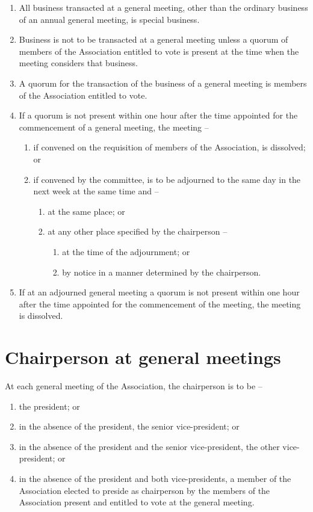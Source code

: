 \documentclass[a4paper,11pt]{article}
\begin{document}
\begin{enumerate}
	\item All business transacted at a general meeting, other than the ordinary business of an annual general meeting, is special business.
	\item Business is not to be transacted at a general meeting unless a quorum of members of the Association entitled to vote is present at the time when the meeting considers that business.
	\item A quorum for the transaction of the business of a general meeting is \orgQuorum{} members of the Association entitled to vote.
	
	\item If a quorum is not present within one hour after the time appointed for the commencement of a general meeting, the meeting --
	\begin{enumerate}
		\item if convened on the requisition of members of the Association, is dissolved; or

		\item if convened by the committee, is to be adjourned to the same day in the next week at the same time and --
		\begin{enumerate}
			\item at the same place; or
			
			\item at any other place specified by the chairperson --
			\begin{enumerate}
				\item at the time of the adjournment; or
				\item by notice in a manner determined by the chairperson.
			\end{enumerate}
		\end{enumerate}
	\end{enumerate}
	
	\item If at an adjourned general meeting a quorum is not present within one hour after the time appointed for the commencement of the meeting, the meeting is dissolved.
\end{enumerate}

\section{Chairperson at general meetings}
\label{rule:chair}

At each general meeting of the Association, the chairperson is to be --
\begin{enumerate}
	\item the president; or
	\item in the absence of the president, the senior vice-president; or
	\item in the absence of the president and the senior vice-president, the other vice-president; or
	\item in the absence of the president and both vice-presidents, a member of the Association elected to preside as chairperson by the members of the Association present and entitled to vote at the general meeting.
\end{enumerate}
\end{document}
